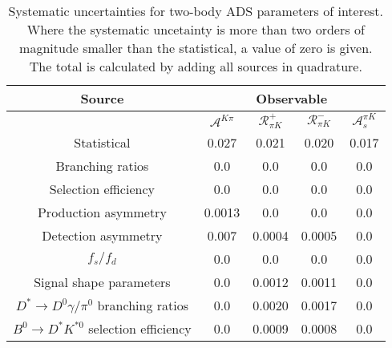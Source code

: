 \begin{sidewaystable}
  \centering
  \begin{tabular}{ccccc}
      \toprule
      Source & \multicolumn{4}{c}{Observable} \\
      \midrule
       & $\mathcal{A}^{K\pi}$ & $\mathcal{R}_{\pi K}^+$ & $\mathcal{R}_{\pi K}^-$ & $\mathcal{A}_s^{\pi K}$ \\
      \midrule
      Statistical & 0.027 & 0.021 & 0.020 & 0.017 \\
      \midrule
      Branching ratios & 0.0  & 0.0  & 0.0  & 0.0  \\
      Selection efficiency & 0.0  & 0.0  & 0.0  & 0.0  \\
      Production asymmetry & 0.0013 & 0.0  & 0.0  & 0.0  \\
      Detection asymmetry & 0.007 & 0.0004 & 0.0005 & 0.0  \\
      $f_s/f_d$ & 0.0  & 0.0  & 0.0  & 0.0  \\
      Signal shape parameters & 0.0  & 0.0012 & 0.0011 & 0.0  \\
      $D^* \to D^0 \gamma/\pi^0$ branching ratios & 0.0  & 0.0020 & 0.0017 & 0.0  \\
      $B^0 \to D^* K^{*0}$ selection efficiency & 0.0  & 0.0009 & 0.0008 & 0.0  \\
      \bottomrule
  \end{tabular}
  \caption{Systematic uncertainties for two-body ADS parameters of interest. Where the systematic uncetainty is more than two orders of magnitude smaller than the statistical, a value of zero is given. The total is calculated by adding all sources in quadrature.}
\label{tab:twoBody_ADS_systematics}
\end{sidewaystable}

